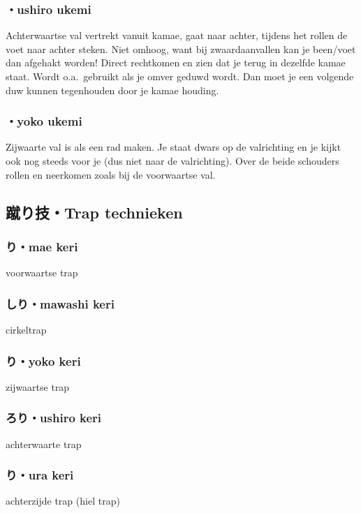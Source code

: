 \subsubsection{・ushiro ukemi}
Achterwaartse val vertrekt vanuit kamae, gaat naar achter, tijdens het rollen de voet naar achter steken. Niet omhoog, want bij zwaardaanvallen kan je been/voet dan afgehakt worden! Direct rechtkomen en zien dat je terug in dezelfde kamae staat. Wordt o.a.\ gebruikt als je omver geduwd wordt. Dan moet je een volgende duw kunnen tegenhouden door je kamae houding.

\subsubsection{・yoko ukemi}
Zijwaarte val is als een rad maken. Je staat dwars op de valrichting en je kijkt ook nog steeds voor je (dus niet naar de valrichting). Over de beide schouders rollen en neerkomen zoals bij de voorwaartse val.

\subsection{蹴り技・Trap technieken}
\subsubsection{り・mae keri}
voorwaartse trap

\subsubsection{しり・mawashi keri}
cirkeltrap

\subsubsection{り・yoko keri} 
zijwaartse trap

\subsubsection{ろり・ushiro keri}
achterwaarte trap   

\subsubsection{り・ura keri}
achterzijde trap (hiel trap)

